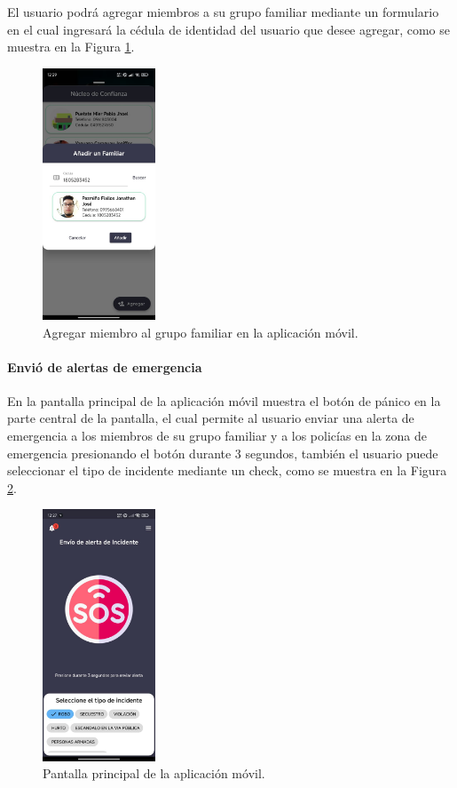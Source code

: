 El usuario podrá agregar miembros a su grupo familiar mediante un formulario en el cual ingresará la cédula de identidad
del usuario que desee agregar, como se muestra en la Figura \ref{fig:agregar-miembro-movil}.

\begin{figure}[H]
    \centering
    \includegraphics[width=0.3\textwidth]{chapters/III-resultados-y-discusion/resources/images/agregar-miembro-movil.png}
    \caption{Agregar miembro al grupo familiar en la aplicación móvil.}
    \label{fig:agregar-miembro-movil}
\end{figure}

\paragraph{Envió de alertas de emergencia}
En la pantalla principal de la aplicación móvil muestra el botón de pánico en la parte central de la pantalla, el cual permite al usuario
enviar una alerta de emergencia a los miembros de su grupo familiar y a los policías en la zona de emergencia presionando el botón
durante 3 segundos, también el usuario puede seleccionar el tipo de incidente mediante un check, como se muestra en la Figura
\ref{fig:pantalla-principal-movil}.

\begin{figure}[H]
    \centering
    \includegraphics[width=0.3\textwidth]{chapters/III-resultados-y-discusion/resources/images/pantalla-principal-movil.png}
    \caption{Pantalla principal de la aplicación móvil.}
    \label{fig:pantalla-principal-movil}
\end{figure}

